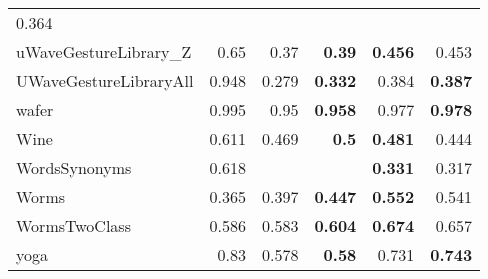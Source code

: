 \begin{longtable}[c]{|l||r||r|r||r|r|}
0.364
\\
uWaveGestureLibrary\_Z &
0.65 &
0.37 &
\cellcolor[rgb]{ .973,  .796,  .678} \textbf{0.39} &
\cellcolor[rgb]{ .973,  .796,  .678} \textbf{0.456} &
0.453
\\
\rowcolor[rgb]{ .851,  .851,  .851} UWaveGestureLibraryAll &
0.948 &
0.279 &
\cellcolor[rgb]{ .973,  .796,  .678} \textbf{0.332} &
0.384 &
\cellcolor[rgb]{ .973,  .796,  .678} \textbf{0.387}
\\
wafer &
0.995 &
0.95 &
\cellcolor[rgb]{ .973,  .796,  .678} \textbf{0.958} &
0.977 &
\cellcolor[rgb]{ .973,  .796,  .678} \textbf{0.978}
\\
\rowcolor[rgb]{ .851,  .851,  .851} Wine &
0.611 &
0.469 &
\cellcolor[rgb]{ .973,  .796,  .678} \textbf{0.5} &
\cellcolor[rgb]{ .973,  .796,  .678} \textbf{0.481} &
0.444
\\
WordsSynonyms &
0.618 &
&
&
\cellcolor[rgb]{ .973,  .796,  .678} \textbf{0.331} &
0.317
\\
\rowcolor[rgb]{ .851,  .851,  .851} Worms &
0.365 &
0.397 &
\cellcolor[rgb]{ .973,  .796,  .678} \textbf{0.447} &
\cellcolor[rgb]{ .973,  .796,  .678} \textbf{0.552} &
0.541
\\
WormsTwoClass &
0.586 &
0.583 &
\cellcolor[rgb]{ .973,  .796,  .678} \textbf{0.604} &
\cellcolor[rgb]{ .973,  .796,  .678} \textbf{0.674} &
0.657
\\
\rowcolor[rgb]{ .851,  .851,  .851} yoga &
0.83 &
0.578 &
\cellcolor[rgb]{ .973,  .796,  .678} \textbf{0.58} &
0.731 &
\cellcolor[rgb]{ .973,  .796,  .678} \textbf{0.743}
\bigstrut[b]\\
\hline
\end{longtable}%

